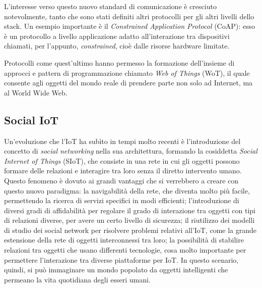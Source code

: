L'interesse verso questo nuovo standard di comunicazione è cresciuto notevolmente, tanto che sono stati definiti altri protocolli per gli altri livelli dello stack. Un esempio importante è il \textit{Constrained Application Protocol} (CoAP): esso è un protocollo a livello applicazione adatto all’interazione tra dispositivi chiamati, per l'appunto, \textit{constrained}, cioè dalle risorse hardware limitate.

Protocolli come quest'ultimo hanno permesso la formazione dell'insieme di approcci e pattern di programmazione chiamato \textit{Web of Things} (WoT), il quale consente agli oggetti del mondo reale di prendere parte non solo ad Internet, ma al World Wide Web.


\subsection{Social IoT}
\label{c:tec:siot}
Un'evoluzione che l'IoT ha sub\`ito in tempi molto recenti è l'introduzione del concetto di \textit{social networking} nella sua architettura, formando la cosiddetta \textit{Social Internet of Things}\cite{Atzori2012} (SIoT), che consiste in una rete in cui gli oggetti possono formare delle relazioni e interagire tra loro senza il diretto intervento umano. Questo fenomeno è dovuto ai grandi vantaggi che si verrebbero a creare con questo nuovo paradigma: la navigabilità della rete, che diventa molto più facile, permettendo la ricerca di servizi specifici in modi efficienti; l'introduzione di diversi gradi di affidabilità per regolare il grado di interazione tra oggetti con tipi di relazioni diverse, per avere un certo livello di sicurezza; il riutilizzo dei modelli di studio dei social network per risolvere problemi relativi all'IoT, come la grande estensione della rete di oggetti interconnessi tra loro; la possibilità di stabilire relazioni tra oggetti che usano differenti tecnologie, cosa molto importante per permettere l'interazione tra diverse piattaforme per IoT. In questo scenario, quindi, si può immaginare un mondo popolato da oggetti intelligenti che permeano la vita quotidiana degli esseri umani.

